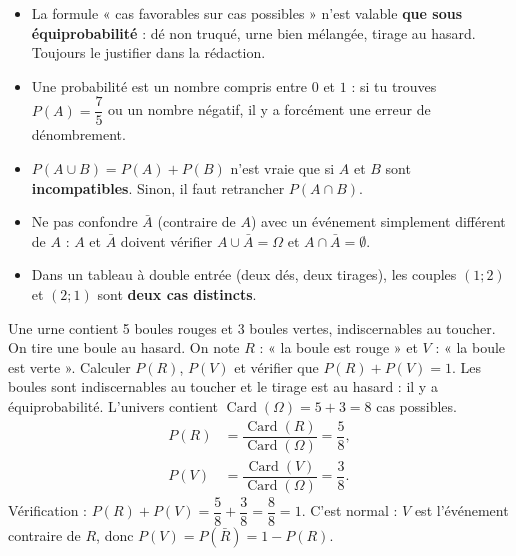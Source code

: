 \documentclass[11pt]{article}
\begin{document}
\begin{attention}
\begin{itemize}
  \item La formule « cas favorables sur cas possibles » n'est valable \textbf{que sous équiprobabilité} : dé non truqué, urne bien mélangée, tirage au hasard. Toujours le justifier dans la rédaction.
  \item Une probabilité est un nombre compris entre $0$ et $1$ : si tu trouves $P(A)=\dfrac{7}{5}$ ou un nombre négatif, il y a forcément une erreur de dénombrement.
  \item $P(A\cup B)=P(A)+P(B)$ n'est vraie que si $A$ et $B$ sont \textbf{incompatibles}. Sinon, il faut retrancher $P(A\cap B)$.
  \item Ne pas confondre $\bar{A}$ (contraire de $A$) avec un événement simplement différent de $A$ : $A$ et $\bar{A}$ doivent vérifier $A\cup\bar{A}=\Omega$ et $A\cap\bar{A}=\emptyset$.
  \item Dans un tableau à double entrée (deux dés, deux tirages), les couples $(1;2)$ et $(2;1)$ sont \textbf{deux cas distincts}.
\end{itemize}
\end{attention}

\begin{exoresolu}
Une urne contient 5 boules rouges et 3 boules vertes, indiscernables au toucher. On tire une boule au hasard. On note $R$ : « la boule est rouge » et $V$ : « la boule est verte ». Calculer $P(R)$, $P(V)$ et vérifier que $P(R)+P(V)=1$.
\tcblower
Les boules sont indiscernables au toucher et le tirage est au hasard : il y a équiprobabilité. L'univers contient $\operatorname{Card}(\Omega)=5+3=8$ cas possibles.
\begin{align*}
P(R) &= \dfrac{\operatorname{Card}(R)}{\operatorname{Card}(\Omega)} = \dfrac{5}{8}, \\
P(V) &= \dfrac{\operatorname{Card}(V)}{\operatorname{Card}(\Omega)} = \dfrac{3}{8}.
\end{align*}
Vérification : $P(R)+P(V)=\dfrac{5}{8}+\dfrac{3}{8}=\dfrac{8}{8}=1$. C'est normal : $V$ est l'événement contraire de $R$, donc $P(V)=P(\bar{R})=1-P(R)$.
\end{exoresolu}
\end{document}
